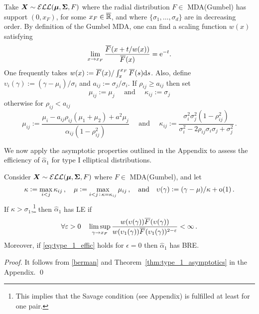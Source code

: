 Take $\bm{X} \sim \mathcal{ELL}(\bm{\mu}, \bm{\Sigma}, F)$ where the radial distribution $F \in$  MDA(Gumbel) has support $(0,x_F)$, for some $x_F \in \overline{\mathbb{R}}$, and where $\{\sigma_1, \dots, \sigma_d\}$ are in decreasing order. By definition of the Gumbel MDA, one can find a scaling function $w(x)$ satisfying
\begin{equation*}
  \lim_{x\to x_F} \frac{\Ftail(x+t/w(x))}{\Ftail(x)}=\e^{-t}.
\end{equation*}
One frequently takes $w(x):= \Ftail(x) / \int_{x}^{x_F}\Ftail(s) \dd s$.
Also, define $\upsilon_i(\gamma) := (\gamma - \mu_i)/\sigma_i$ and $a_{ij} := \sigma_j/\sigma_i$. If $\rho_{ij} \ge a_{ij}$ then set
 \[ \mu_{ij}:= \mu_j \quad \text{ and } \quad \kappa_{ij}:= \sigma_j \]
 otherwise for $\rho_{ij} < a_{ij}$
 \[ \mu_{ij}:= \frac{\mu_i-a_{ij}\rho_{ij}(\mu_1+\mu_2)+a^2\mu_j}{\alpha_{ij}(1-\rho^2_{ij})} \quad \text{ and } \quad \kappa_{ij}:= \frac{\sigma_i^2\sigma_j^2(1-\rho^2_{ij})}{ {\sigma_i^2-2\rho_{ij}\sigma_i\sigma_j + \sigma_{j}^2}} \,. \]

We now apply the asymptotic properties outlined in the
Appendix to assess the efficiency of $\hat{\alpha}_1$ for type I elliptical distributions. 

\begin{Theorem} \label{thm:ellip_efficiency}
Consider $\bm{X} \sim \mathcal{ELL}(\bm{\mu}, \bm{\Sigma}, F)$ where $F \in$ MDA(Gumbel), and let
 \[ \kappa := \max_{i<j} \kappa_{ij} \,, \quad \mu := \max_{i<j \,:\, \kappa = \kappa_{ij}} \mu_{ij} \,, \quad \text{and} \quad  \upsilon(\gamma):= (\gamma-\mu)/\kappa + {\mathrm{o}}(1) \,. \]
 If $\kappa>\sigma_1$,\footnote{This implies that the Savage condition (see Appendix) is fulfilled at least for one pair.} then $\hat{\alpha}_1$ has LE if
 \begin{equation} \label{eq:type_1_effic}
 	\forall \epsilon>0 \quad 
   \limsup_{\gamma\to x_F}\frac{w(\upsilon(\gamma))\Ftail(\upsilon(\gamma))}
   {w(\upsilon_1(\gamma))\Ftail(\upsilon_1(\gamma))^{2-\epsilon}}<\infty \,.
 \end{equation}
 Moreover, if \eqref{eq:type_1_effic} holds for $\epsilon=0$ then $\hat{\alpha}_1$ has BRE.
\end{Theorem}

\begin{proof}
 It follows from \eqref{berman} and Theorem~\ref{thm:type_1_asymptotics} in the Appendix. 
 \qed
\end{proof}


